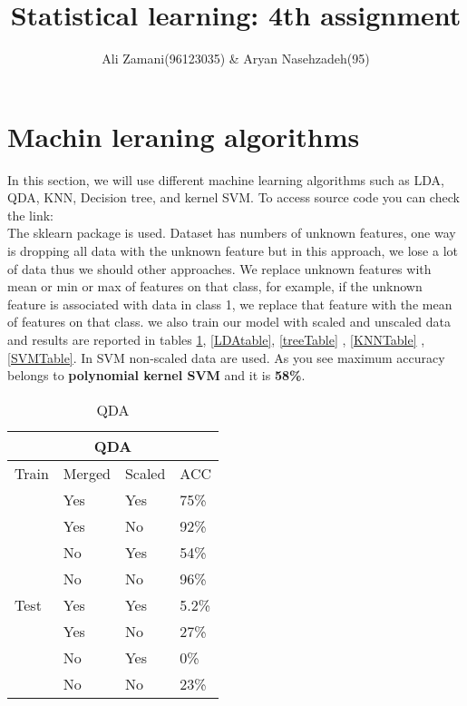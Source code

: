 \documentclass[17pt]{article}
\title{
	{\large Statistical learning: 4th assignment}\\}
\author{Ali Zamani(96123035) \& Aryan Nasehzadeh(95)}
\begin{document}
\maketitle

\newpage
\section{Machin leraning algorithms}
In this section, we will use different machine learning algorithms such as LDA, QDA, KNN, Decision tree, and kernel SVM. To access source code you can check the link:\\
The sklearn package is used.
Dataset has numbers of unknown features, one way is dropping all data with the unknown feature but in this approach, we lose a lot of data thus we should other approaches. 
We replace unknown features with mean or min or max of features on that class, for example, if the unknown feature is associated with data in class 1, we replace that feature with the mean of features on that class. we also train our model with scaled and unscaled data and results are reported in tables \ref{QDATable}, \ref{LDAtable}, \ref{treeTable} , \ref{KNNTable} , \ref{SVMTable}. In SVM non-scaled data are used. As you see maximum accuracy belongs to \textbf{polynomial kernel SVM} and it is \textbf{58\%}.
\newpage
\begin{table}[]
	\caption{QDA}
	\centering
	\label{QDATable}
	\begin{tabular}{|l|l|l|l|}
		\hline
		\multicolumn{4}{|c|}{QDA}\\
		\cline{1-4}
		\hline
		Train & Merged & Scaled & ACC \\
		\cline{2-4}
		 &    Yes      &   Yes    & 75\%  \\
		\cline{2-4}
		&    Yes      &   No     & 92\%\\
		\cline{2-4}
		& No & Yes &  54\%\\
		\cline{2-4}
		& No & No & 96\%\\
		\hline
		
		Test & Yes & Yes & 5.2\% \\
		\cline{2-4}
		&    Yes      &   No     & 27\%\\
		\cline{2-4}
		& No & Yes & 0\% \\
		\cline{2-4}
		& No & No & 23\%\\
		\hline
	\end{tabular}
\end{table}
\end{document}
